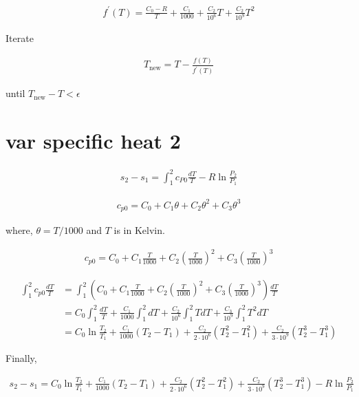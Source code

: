 \documentclass{article}
\begin{document}
	\begin{align*}
		f^\prime(T) = \frac{C_0 - R}{T} + \frac{C_1}{1000} + \frac{C_2}{10^6}T + \frac{C_2}{10^9}T^2
	\end{align*}

	Iterate

	\begin{align*}
		T_\text{new} = T - \frac{f(T)}{f^\prime(T)}
	\end{align*}

	until $T_\text{new} - T < \epsilon$

	\section{var specific heat 2}

	\begin{align*}
		s_2 - s_1 = \int_1^2 c_{P0}\frac{dT}{T} - R\ln\frac{P_2}{P_1}
	\end{align*}

	\begin{align*}
		c_{p0} = C_0 + C_1\theta + C_2\theta^2 + C_3\theta^3
	\end{align*}

	where, $\theta=T/1000$ and $T$ is in Kelvin.

	\begin{align*}
		c_{p0} = C_0 + C_1\frac{T}{1000} + C_2\left(\frac{T}{1000}\right)^2 + C_3\left(\frac{T}{1000}\right)^3
	\end{align*}

	\begin{align*}
		\int_1^2 c_{p0}\frac{dT}{T}
		&=
		\int_1^2 \left(C_0 + C_1\frac{T}{1000} + C_2\left(\frac{T}{1000}\right)^2 + C_3\left(\frac{T}{1000}\right)^3\right)\frac{dT}{T}\\
		&=
		C_0\int_1^2 \frac{dT}{T} + \frac{C_1}{1000}\int_1^2 dT + \frac{C_2}{10^6}\int_1^2 TdT + \frac{C_3}{10^9}\int_1^2 T^2dT\\
		&=
		C_0\ln\frac{T_2}{T_1} + \frac{C_1}{1000}(T_2 - T_1) + \frac{C_2}{2\cdot10^6}(T_2^2 - T_1^2) + \frac{C_2}{3\cdot10^9}(T_2^3 - T_1^3)
	\end{align*}

	Finally,

	\begin{align*}
		s_2 - s_1 = C_0\ln\frac{T_2}{T_1} + \frac{C_1}{1000}(T_2 - T_1) + \frac{C_2}{2\cdot10^6}(T_2^2 - T_1^2) + \frac{C_2}{3\cdot10^9}(T_2^3 - T_1^3) - R\ln\frac{P_2}{P_1}
	\end{align*}
\end{document}
